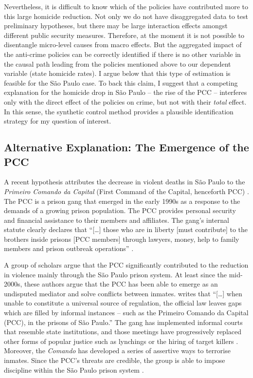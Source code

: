Nevertheless, it is difficult to know which of the policies have contributed more to this large homicide reduction. Not only we do not have disaggregated data to test preliminary hypotheses, but there may be large interaction effects amongst different public security measures. Therefore, at the moment it is not possible to disentangle micro-level causes from macro effects. But the aggregated impact of the anti-crime policies can be correctly identified if there is no other variable in the causal path leading from the policies mentioned above to our dependent variable (state homicide rates). I argue below that this type of estimation is feasible for the São Paulo case. To back this claim, I suggest that a competing explanation for the homicide drop in São Paulo -- the rise of the PCC -- interferes only with the direct effect of the policies on crime, but not with their \emph{total} effect. In this sense, the synthetic control method provides a plausible identification strategy for my question of interest.

\subsection{Alternative Explanation: The Emergence of the PCC}
\label{sub:alternative_explanation_the_emergence_of_the_pcc}

A recent hypothesis attributes the decrease in violent deaths in São Paulo to the \emph{Primeiro Comando da Capital} (First Command of the Capital, henceforth PCC) \citep{biondi2010, dias2009, dias2011pulverizaccao, de2010crime, de2012governo, willis2015killing}. The PCC is a prison gang that emerged in the early 1990s as a response to the demands of a growing prison population. The PCC provides personal security and financial assistance to their members and affiliates. The gang's internal statute clearly declares that ``[\dots] those who are in liberty [must contribute] to the brothers inside prisons [PCC members] through lawyers, money, help to family members and prison outbreak operations'' \citep{folha2001estatutopcc}.

A group of scholars argue that the PCC significantly contributed to the reduction in violence mainly through the São Paulo prison system. At least since the mid-2000s, these authors argue that the PCC has been able to emerge as an undisputed mediator and solve conflicts between inmates. \citet[p. 83]{dias2009ocupando} writes that ``[\dots] when unable to constitute a universal source of regulation, the official law leaves gaps which are filled by informal instances -- such as the Primeiro Comando da Capital (PCC), in the prisons of São Paulo.'' The gang has implemented informal courts that resemble state institutions, and those meetings have progressively replaced other forms of popular justice such as lynchings or the hiring of target killers \citep[p. 3]{feltran2012metodos}. Moreover, the \emph{Comando} has developed a series of assertive ways to terrorise inmates. Since the PCC's threats are credible, the group is able to impose discipline within the São Paulo prison system \citep{biondi2010,dias2009}.


